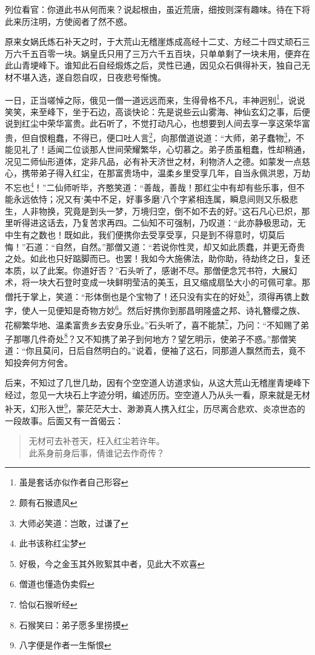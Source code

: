 \documentclass[12pt,oneside]{book}
\newenvironment{shici}{
\begin{verse}
\centering\large\hspace{12pt}}
{\end{verse}}
\begin{document}
列位看官：你道此书从何而来？说起根由，虽近荒唐，细按则深有趣味。待在下将此来历注明，方使阅者了然不惑。

原来女娲氏炼石补天之时，于大荒山无稽崖炼成高经十二丈、方经二十四丈顽石三万六千五百零一块。娲皇氏只用了三万六千五百块，只单单剩了一块未用，便弃在此山青埂峰下。谁知此石自经煅炼之后，灵性已通，因见众石俱得补天，独自己无材不堪入选，遂自怨自叹，日夜悲号惭愧。

一日，正当嗟悼之际，俄见一僧一道远远而来，生得骨格不凡，丰神迥别\footnote{虽是套话亦似作者自己形容}，说说笑笑，来至峰下，坐于石边，高谈快论：先是说些云山雾海、神仙玄幻之事，后便说到红尘中荣华富贵。此石听了，不觉打动凡心，也想要到人间去享一享这荣华富贵，但自恨粗蠢，不得已，便口吐人言\footnote{颇有石猴遗风}，向那僧道说道：“大师，弟子蠢物\footnote{大师必笑道：岂敢，过谦了}，不能见礼了！适闻二位谈那人世间荣耀繁华，心切慕之。弟子质虽粗蠢，性却稍通，况见二师仙形道体，定非凡品，必有补天济世之材，利物济人之德。如蒙发一点慈心，携带弟子得入红尘，在那富贵场中，温柔乡里受享几年，自当永佩洪恩，万劫不忘也\footnote{此书该称红尘梦}！”二仙师听毕，齐憨笑道：“善哉，善哉！那红尘中有却有些乐事，但不能永远依恃；况又有‘美中不足，好事多磨’八个字紧相连属，瞬息间则又乐极悲生，人非物换，究竟是到头一梦，万境归空，倒不如不去的好。”这石凡心已炽，那里听得进这话去，乃复苦求再四。二仙知不可强制，乃叹道：“此亦静极思动，无中生有之数也！既如此，我们便携你去受享受享，只是到不得意时，切莫后悔！”石道：“自然，自然。”那僧又道：“若说你性灵，却又如此质蠢，并更无奇贵之处。如此也只好踮脚而已。也罢！我如今大施佛法，助你助，待劫终之日，复还本质，以了此案。你道好否？”石头听了，感谢不尽。那僧便念咒书符，大展幻术，将一块大石登时变成一块鲜明莹洁的美玉，且又缩成扇坠大小的可佩可拿。那僧托于掌上，笑道：“形体倒也是个宝物了！还只没有实在的好处\footnote{好极，今之金玉其外败絮其中者，见此大不欢喜}，须得再镌上数字，使人一见便知是奇物方妙\footnote{僧道也懂造伪卖假}。然后好携你到那昌明隆盛之邦、诗礼簪缨之族、花柳繁华地、温柔富贵乡去安身乐业。”石头听了，喜不能禁\footnote{恰似石猴听经}，乃问：“不知赐了弟子那哪几件奇处\footnote{石猴笑曰：弟子愿多里捞摸}？又不知携了弟子到何地方？望乞明示，使弟子不惑。”那僧笑道：“你且莫问，日后自然明白的。”说着，便袖了这石，同那道人飘然而去，竟不知投奔何方何舍。

后来，不知过了几世几劫，因有个空空道人访道求仙，从这大荒山无稽崖青埂峰下经过，忽见一大块石上字迹分明，编述历历。空空道人乃从头一看，原来就是无材补天，幻形入世\footnote{八字便是作者一生惭恨}，蒙茫茫大士、渺渺真人携入红尘，历尽离合悲欢、炎凉世态的一段故事。后面又有一首偈云：


\begin{shici}
无材可去补苍天，枉入红尘若许年。\\
此系身前身后事，倩谁记去作奇传？
\end{shici}
\end{document}
